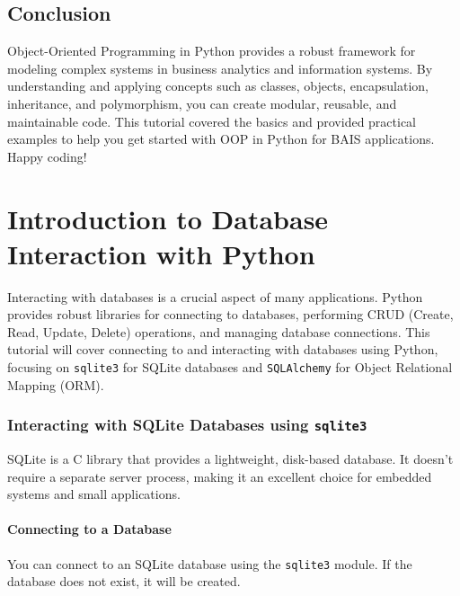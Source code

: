 \documentclass[
  letterpaper,
  DIV=11,
  numbers=noendperiod]{scrreprt}
\begin{document}
\section{Conclusion}\label{conclusion-14}

Object-Oriented Programming in Python provides a robust framework for
modeling complex systems in business analytics and information systems.
By understanding and applying concepts such as classes, objects,
encapsulation, inheritance, and polymorphism, you can create modular,
reusable, and maintainable code. This tutorial covered the basics and
provided practical examples to help you get started with OOP in Python
for BAIS applications. Happy coding!


\chapter{Introduction to Database Interaction with
Python}\label{introduction-to-database-interaction-with-python}

Interacting with databases is a crucial aspect of many applications.
Python provides robust libraries for connecting to databases, performing
CRUD (Create, Read, Update, Delete) operations, and managing database
connections. This tutorial will cover connecting to and interacting with
databases using Python, focusing on \texttt{sqlite3} for SQLite
databases and \texttt{SQLAlchemy} for Object Relational Mapping (ORM).

\subsection{\texorpdfstring{Interacting with SQLite Databases using
\texttt{sqlite3}}{Interacting with SQLite Databases using sqlite3}}\label{interacting-with-sqlite-databases-using-sqlite3}

SQLite is a C library that provides a lightweight, disk-based database.
It doesn't require a separate server process, making it an excellent
choice for embedded systems and small applications.

\subsubsection{Connecting to a Database}\label{connecting-to-a-database}

You can connect to an SQLite database using the \texttt{sqlite3} module.
If the database does not exist, it will be created.
\end{document}
